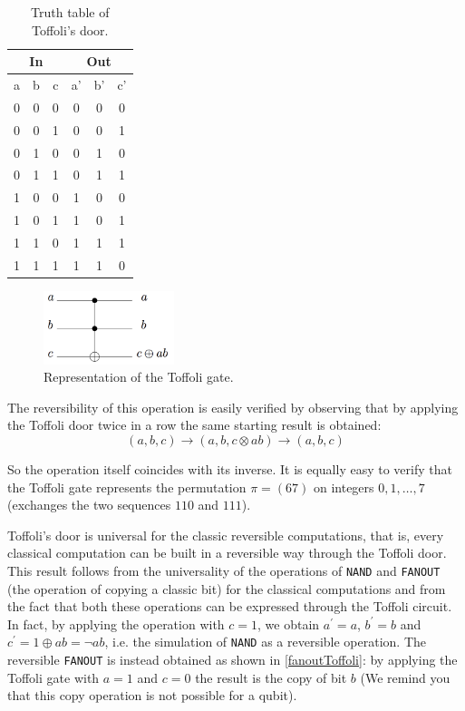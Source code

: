 \documentclass[a4paper,10pt]{article}
\begin{document}
\begin{table}[!htb]
\centering
\begin{tabular}{|c|c|c|c|c|c|}
\hline
\multicolumn{3}{|c|}{In} & \multicolumn{3}{c|}{Out} \\ \hline
a & b & c & a' & b' & c' \\ \hline
0 & 0 & 0 & 0 & 0 & 0 \\ \hline
0 & 0 & 1 & 0 & 0 & 1 \\ \hline
0 & 1 & 0 & 0 & 1 & 0 \\ \hline
0 & 1 & 1 & 0 & 1 & 1 \\ \hline
1 & 0 & 0 & 1 & 0 & 0 \\ \hline
1 & 0 & 1 & 1 & 0 & 1 \\ \hline
1 & 1 & 0 & 1 & 1 & 1 \\ \hline
1 & 1 & 1 & 1 & 1 & 0 \\ \hline
\end{tabular}
\caption{Truth table of Toffoli's door.}
\label{toffoliTable}
\end{table}

\begin{figure}[!htb]
\begin{center}
\includegraphics[width=1.5in]{images/toffoli.png}
\caption{Representation of the Toffoli gate.}
\label{toffoliGate}
\end{center}
\end{figure}

The reversibility of this operation is easily verified by observing that by applying the Toffoli door twice in a row the same starting result is obtained:
$$(a, b, c) \rightarrow{} (a, b, c \otimes ab) \rightarrow{} (a, b, c)$$

So the operation itself coincides with its inverse. It is equally easy to verify that the Toffoli gate represents the permutation $\pi = (67)$ on integers $0, 1, \ldots , 7$ (exchanges the two sequences $110$ and $111$).

Toffoli's door is universal for the classic reversible computations, that is, every classical computation can be built in a reversible way through the Toffoli door. This result follows from the universality of the operations of \texttt{NAND} and \texttt{FANOUT} (the operation of copying a classic bit) for the classical computations and from the fact that both these operations can be expressed through the Toffoli circuit. In fact, by applying the operation with $c = 1$, we obtain $a^{'}= a$, $b^{'} = b$ and $c^{'} = 1 \oplus ab = \neg ab$, i.e. the simulation of \texttt{NAND} as a reversible operation. The reversible \texttt{FANOUT} is instead obtained as shown in \autoref{fanoutToffoli}: by applying the Toffoli gate with $a = 1$ and $c = 0$ the result is the copy of bit $b$ (We remind you that this copy operation is not possible for a qubit).
\end{document}
